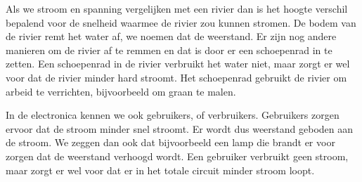 Als we stroom en spanning vergelijken met een rivier dan is het hoogte verschil bepalend voor de snelheid waarmee de rivier zou kunnen stromen. De bodem van de rivier remt het water af, we noemen dat de weerstand. Er zijn nog andere manieren om de rivier af te remmen en dat is door er een schoepenrad in te zetten. Een schoepenrad in de rivier verbruikt het water niet, maar zorgt er wel voor dat de rivier minder hard stroomt. Het schoepenrad gebruikt de rivier om arbeid te verrichten, bijvoorbeeld om graan te malen.

In de electronica kennen we ook gebruikers, of verbruikers. Gebruikers zorgen ervoor dat de stroom minder snel stroomt. Er wordt dus weerstand geboden aan de stroom. We zeggen dan ook dat bijvoorbeeld een lamp die brandt er voor zorgen dat de weerstand verhoogd wordt. Een gebruiker verbruikt geen stroom, maar zorgt er wel voor dat er in het totale circuit minder stroom loopt.

